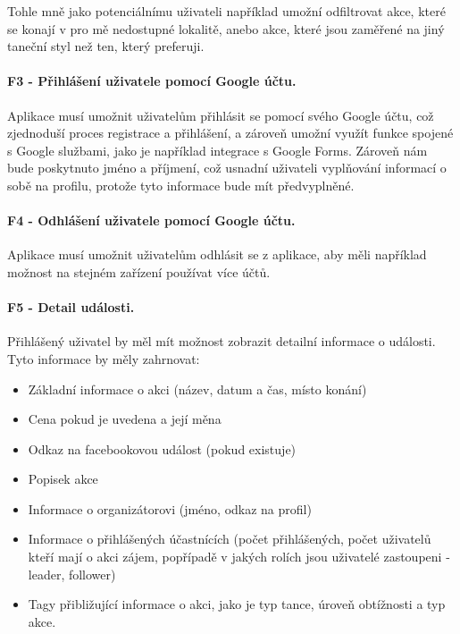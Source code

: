 Tohle mně jako potenciálnímu uživateli například umožní odfiltrovat akce, které se konají v pro mě nedostupné lokalitě, anebo akce, které jsou zaměřené na jiný taneční styl než ten, který preferuji.

\paragraph{F3 - Přihlášení uživatele pomocí Google účtu.}\label{req:F3}
Aplikace musí umožnit uživatelům přihlásit se pomocí svého Google účtu, což zjednoduší proces registrace a přihlášení, a zároveň umožní využít funkce spojené s Google službami, jako je například integrace s Google Forms. Zároveň nám bude poskytnuto jméno a příjmení, což usnadní uživateli vyplňování informací o sobě na profilu, protože tyto informace bude mít předvyplněné.

\paragraph{F4 - Odhlášení uživatele pomocí Google účtu.}\label{req:F4}
Aplikace musí umožnit uživatelům odhlásit se z aplikace, aby měli například možnost na stejném zařízení používat více účtů. 

\paragraph{F5 - Detail události.}\label{req:F5}
Přihlášený uživatel by měl mít možnost zobrazit detailní informace o události. Tyto informace by měly zahrnovat:
\begin{itemize}
    \item Základní informace o akci (název, datum a čas, místo konání)
    \item Cena pokud je uvedena a její měna
    \item Odkaz na facebookovou událost (pokud existuje)
    \item Popisek akce
    \item Informace o organizátorovi (jméno, odkaz na profil)
    \item Informace o přihlášených účastnících (počet přihlášených, počet uživatelů kteří mají o akci zájem, popřípadě v jakých rolích jsou uživatelé zastoupeni - leader, follower)
    \item Tagy přibližující informace o akci, jako je typ tance, úroveň obtížnosti a typ akce.
\end{itemize}

